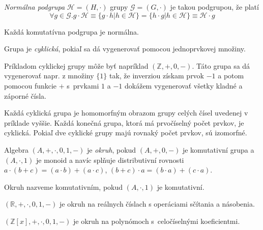 \begin{definition}
    {\em Normálna podgrupa} $\mathcal{H}=(H,\cdot)$ grupy 
	$\mathcal{G}=(G, \cdot)$ je takou podgrupou, že platí
	\[
		\forall g \in \mathcal{G}. g \cdot \mathcal{H} \equiv \{ g \cdot h | h \in \mathcal{H} \} = \{ h \cdot g | h \in \mathcal{H} \} \equiv \mathcal{H} \cdot g
	\]
\end{definition}

\begin{example}
	Každá komutatívna podgrupa je normálna.
\end{example}

\begin{definition}
    Grupa je {\em cyklická}, pokiaľ sa dá vygenerovať pomocou jednoprvkovej množiny.
\end{definition}

\begin{example}
	Príkladom cyklickej grupy môže byť napríklad $(\mathbb{Z}, +, 0, -)$.
	Táto grupa sa dá vygenerovať napr. z množiny $\{1\}$ tak, že
	inverziou získam prvok $-1$ a potom pomocou funkcie $+$
	s~prvkami $1$ a $-1$ dokážem vygenerovať všetky kladné
	a záporné čísla.
\end{example}

Každá cyklická grupa je homomorfným obrazom grupy celých čísel
uvedenej v príklade vyššie. Každá konečná grupa, ktorá má prvočíselný
počet prvkov, je cyklická. Pokiaľ dve cyklické grupy majú rovnaký počet
prvkov, sú izomorfné.

\begin{definition}[Okruh]
    Algebra $(A, +, \cdot, 0, 1, -)$ je {\em okruh}, pokud
    $(A, +, 0, -)$ je komutativní grupa
    a $(A, \cdot, 1)$ je monoid
    a navíc splňuje distributivní rovnosti
    $a \cdot (b + c) = (a \cdot b) + (a \cdot c)$,
    $(b + c) \cdot a = (b \cdot a) + (c \cdot a)$.

    Okruh nazveme komutativním, pokud $(A, \cdot, 1)$ je komutativní.
\end{definition}

\begin{example}
    $(\mathbb{R}, +, \cdot, 0, 1, -)$ je okruh na reálnych 
	číslach s operáciami sčítania a násobenia.
\end{example}

\begin{example}
	$(\mathbb{Z}[x], +, \cdot, 0, 1, -)$ je okruh na polynómoch
	s~celočíselnými koeficientmi.
\end{example}

